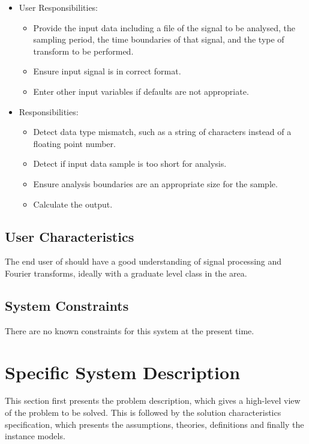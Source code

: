 \documentclass[12pt]{article}
\begin{document}
\begin{itemize}
\item User Responsibilities:
\begin{itemize}
\item Provide the input data including a file of the signal to be analysed, the sampling period, the time boundaries of that signal, and the type of transform to be performed.
\item Ensure input signal is in correct format.
\item Enter other input variables if defaults are not appropriate.
\end{itemize}
\item \progname{} Responsibilities:
\begin{itemize}
\item Detect data type mismatch, such as a string of characters instead of a
  floating point number.
\item Detect if input data sample is too short for analysis.
\item Ensure analysis boundaries are an appropriate size for the sample.
\item Calculate the output.
\end{itemize}
\end{itemize}

\subsection{User Characteristics} \label{SecUserCharacteristics}
 
  The end user of \progname{} should have a good understanding of signal processing and Fourier transforms, ideally with a graduate level class in the area. 

\subsection{System Constraints}

There are no known constraints for this system at the present time. 

\section{Specific System Description}

This section first presents the problem description, which gives a high-level
view of the problem to be solved.  This is followed by the solution characteristics
specification, which presents the assumptions, theories, definitions and finally
the instance models. 
\end{document}
